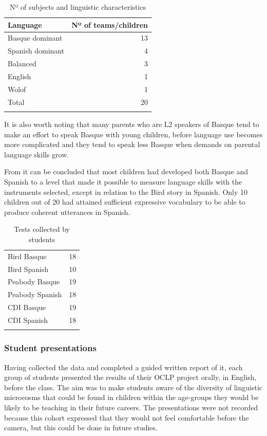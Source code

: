 \documentclass[output=paper]{../langscibook}
\begin{document}
\begin{table}
\begin{tabularx}{.8\textwidth}{Xr}
\lsptoprule
Language & Nº of teams\slash children\\\midrule
Basque dominant & 13\\ 
Spanish dominant & 4\\
Balanced & 3\\
English & 1\\
Wolof & 1\\\midrule
Total & 20\\\lspbottomrule
\end{tabularx}
\caption{Nº of subjects and linguistic characteristics\label{tab:6:1}}
\end{table}

It is also worth noting that many parents who are L2 speakers of Basque tend to make an effort to speak Basque with young children, before language use becomes more complicated and they tend to speak less Basque when demands on parental language skills grow.

From  it can be concluded that most children had developed both Basque and Spanish to a level that made it possible to measure language skills with the instruments selected, except in relation to the Bird story in Spanish. Only 10 children out of 20 had attained sufficient expressive vocabulary to be able to produce coherent utterances in Spanish.

\begin{table}
\begin{tabularx}{.8\textwidth}{Xr}
\lsptoprule
Bird Basque & 18\\
Bird Spanish & 10\\
Peabody Basque & 19\\
Peabody Spanish & 18\\
CDI Basque & 19\\
CDI Spanish & 18\\\lspbottomrule
\end{tabularx}
\caption{Tests collected by students\label{tab:6:2}}
\end{table}


\subsubsection{Student presentations}

Having collected the data and completed a guided written report of it, each group of students presented the results of their OCLP project orally, in English, before the class. The aim was to make students aware of the diversity of linguistic microcosms that could be found in children within the age-groups they would be likely to be teaching in their future careers. The presentations were not recorded because this cohort expressed that they would not feel comfortable before the camera, but this could be done in future studies.
\end{document}
